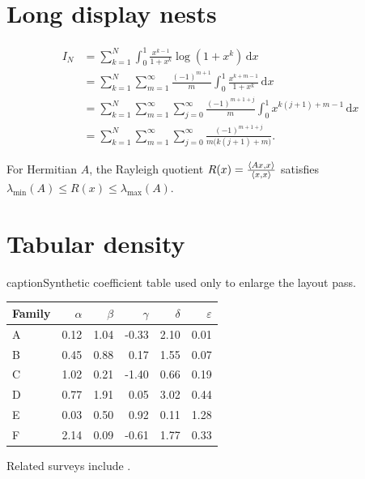 \section{Long display nests}
\begin{align*}
I_{N}
&=
\sum_{k=1}^{N}
\int_{0}^{1}
\frac{x^{k-1}}{1+x^{k}}
\log\!\left(1+x^{k}\right)
\,\mathrm{d}x
\\
&=
\sum_{k=1}^{N}
\sum_{m=1}^{\infty}
\frac{(-1)^{m+1}}{m}
\int_{0}^{1}
\frac{x^{k+m-1}}{1+x^{k}}
\,\mathrm{d}x
\\
&=
\sum_{k=1}^{N}
\sum_{m=1}^{\infty}
\sum_{j=0}^{\infty}
\frac{(-1)^{m+1+j}}{m}
\int_{0}^{1}
x^{k(j+1)+m-1}
\,\mathrm{d}x
\\
&=
\sum_{k=1}^{N}
\sum_{m=1}^{\infty}
\sum_{j=0}^{\infty}
\frac{(-1)^{m+1+j}}{m\bigl(k(j+1)+m\bigr)}.
\end{align*}

\bigmatrixblock

\begin{proposition}
For Hermitian $A$, the Rayleigh quotient
$R(x)=\frac{\left\langle Ax,x\right\rangle}{\left\langle x,x\right\rangle}$ satisfies
$\lambda_{\min}(A)\le R(x)\le\lambda_{\max}(A)$.
\end{proposition}

\section{Tabular density}
\begin{table}[ht]
\centering
caption{Synthetic coefficient table used only to enlarge the layout pass.}
\label{tab:coeffs}
\begin{tabular}{@{}lrrrrr@{}}
\toprule
Family & $\alpha$ & $\beta$ & $\gamma$ & $\delta$ & $\varepsilon$ \\
\midrule
A & 0.12 & 1.04 & -0.33 & 2.10 & 0.01 \\
B & 0.45 & 0.88 &  0.17 & 1.55 & 0.07 \\
C & 1.02 & 0.21 & -1.40 & 0.66 & 0.19 \\
D & 0.77 & 1.91 &  0.05 & 3.02 & 0.44 \\
E & 0.03 & 0.50 &  0.92 & 0.11 & 1.28 \\
F & 2.14 & 0.09 & -0.61 & 1.77 & 0.33 \\
\bottomrule
\end{tabular}
\end{table}

Related surveys include \cite{Evans2010,Brezis2011,Temam1997}.
